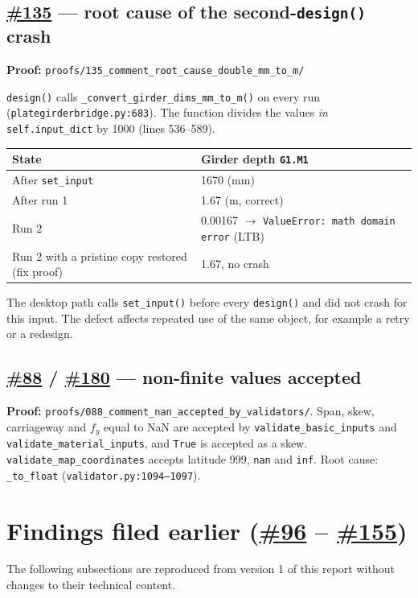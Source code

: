 \documentclass[11pt,a4paper]{article}
\newcommand{\issue}[1]{\href{https://github.com/Nidhikhare12/OsdagBridge/issues/#1}{\##1}}
\newcommand{\proof}[1]{\texttt{proofs/#1}}
\begin{document}
\subsection{\issue{135} --- root cause of the second-\texttt{design()} crash}
\textbf{Proof:} \proof{135\_comment\_root\_cause\_double\_mm\_to\_m/}

\texttt{design()} calls \texttt{\_convert\_girder\_dims\_mm\_to\_m()} on every run (\texttt{plategirderbridge.py:683}). The function divides the values \emph{in} \texttt{self.input\_dict} by 1000 (lines 536--589).

\begin{center}\begin{tabular}{@{}ll@{}}
\toprule
State & Girder depth \texttt{G1.M1} \\
\midrule
After \texttt{set\_input} & 1670 (mm) \\
After run 1 & 1.67 (m, correct) \\
Run 2 & 0.00167 $\rightarrow$ \texttt{ValueError: math domain error} (LTB) \\
Run 2 with a pristine copy restored (fix proof) & 1.67, no crash \\
\bottomrule
\end{tabular}\end{center}
The desktop path calls \texttt{set\_input()} before every \texttt{design()} and did not crash for this input. The defect affects repeated use of the same object, for example a retry or a redesign.

\subsection{\issue{88} / \issue{180} --- non-finite values accepted}
\textbf{Proof:} \proof{088\_comment\_nan\_accepted\_by\_validators/}. Span, skew, carriageway and $f_y$ equal to NaN are accepted by \texttt{validate\_basic\_inputs} and \texttt{validate\_material\_inputs}, and \texttt{True} is accepted as a skew. \texttt{validate\_map\_coordinates} accepts latitude 999, \texttt{nan} and \texttt{inf}. Root cause: \texttt{\_to\_float} (\texttt{validator.py:1094--1097}).



\section{Findings filed earlier (\issue{96} -- \issue{155})}
The following subsections are reproduced from version 1 of this report without changes to their technical content.
\end{document}
